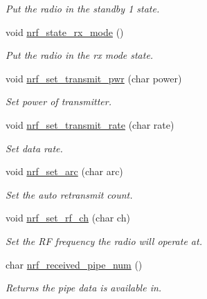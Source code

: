 \begin{DoxyCompactItemize}
\begin{DoxyCompactList}\small\item\em Put the radio in the standby 1 state. \end{DoxyCompactList}\item 
void \hyperlink{group___user_func_gab6c009513f9cf48b9d4beed89e9a2a61}{nrf\+\_\+state\+\_\+rx\+\_\+mode} ()\hypertarget{group___user_func_gab6c009513f9cf48b9d4beed89e9a2a61}{}\label{group___user_func_gab6c009513f9cf48b9d4beed89e9a2a61}

\begin{DoxyCompactList}\small\item\em Put the radio in the rx mode state. \end{DoxyCompactList}\item 
void \hyperlink{group___user_func_gab6847a9be46161756478ac38a091a755}{nrf\+\_\+set\+\_\+transmit\+\_\+pwr} (char power)
\begin{DoxyCompactList}\small\item\em Set power of transmitter. \end{DoxyCompactList}\item 
void \hyperlink{group___user_func_ga62bbc3e318cd92552d65d9ce240c595c}{nrf\+\_\+set\+\_\+transmit\+\_\+rate} (char rate)
\begin{DoxyCompactList}\small\item\em Set data rate. \end{DoxyCompactList}\item 
void \hyperlink{group___user_func_ga7501b4fa31eba5ad34aed21b18bb2a72}{nrf\+\_\+set\+\_\+arc} (char arc)
\begin{DoxyCompactList}\small\item\em Set the auto retransmit count. \end{DoxyCompactList}\item 
void \hyperlink{group___user_func_ga4bf48d64e99c204f20b6fe7c75b703c6}{nrf\+\_\+set\+\_\+rf\+\_\+ch} (char ch)
\begin{DoxyCompactList}\small\item\em Set the RF frequency the radio will operate at. \end{DoxyCompactList}\item 
char \hyperlink{group___user_func_ga8ca9456023217dc20dad11bf5f5682e0}{nrf\+\_\+received\+\_\+pipe\+\_\+num} ()
\begin{DoxyCompactList}\small\item\em Returns the pipe data is available in. \end{DoxyCompactList}\item 

\end{DoxyCompactItemize}

